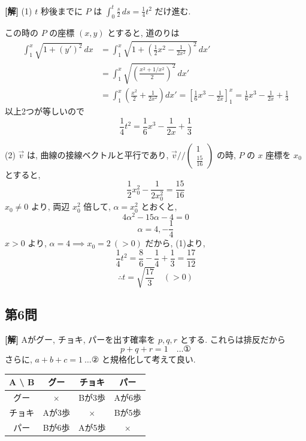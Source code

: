 \documentclass[../main.tex]{subfiles}
\begin{document}
\noindent
\textbf{[解]} (1) $t$ 秒後までに $P$ は $\int_0^t \frac{s}{2} \, ds = \frac{1}{4} t^2$ だけ進む.

この時の $P$ の座標 $(x,y)$ とすると, 道のりは
\begin{align*}
  \int_1^x \sqrt{1 + (y')^2} \, dx &= \int_1^x \sqrt{1 + \left(\frac{1}{2} x^2 - \frac{1}{2x^2}\right)^2} \, dx' \\
  &= \int_1^x \sqrt{\left(\frac{x^2 + 1/x^2}{2}\right)^2} \, dx' \\
  &= \int_1^x \left(\frac{x^2}{2} + \frac{1}{2x^2}\right) dx' = \left[ \frac{1}{6} x^3 - \frac{1}{2x} \right]_1^x = \frac{1}{6} x^3 - \frac{1}{2x} + \frac{1}{3}
\end{align*}
以上2つが等しいので
\[
  \frac{1}{4} t^2 = \frac{1}{6} x^3 - \frac{1}{2x} + \frac{1}{3}
\]

\bigskip

(2) $\vec{v}$ は, 曲線の接線ベクトルと平行であり, $\vec{v} \mathbin{/\!\!/}
\begin{pmatrix} 1 \\ \frac{15}{16}
\end{pmatrix}$ の時, $P$ の $x$ 座標を $x_0$ とすると,
\[
  \frac{1}{2} x_0^2 - \frac{1}{2 x_0^2} = \frac{15}{16}
\]
$x_0 \neq 0$ より, 両辺 $x_0^2$ 倍して, $\alpha = x_0^2$ とおくと,
\[
  4\alpha^2 - 15\alpha - 4 = 0
\]
\[
  \alpha = 4, -\frac{1}{4}
\]
$x > 0$ より, $\alpha = 4 \implies x_0 = 2 \ (>0)$ だから, (1)より,
\[
  \frac{1}{4} t^2 = \frac{8}{6} - \frac{1}{4} + \frac{1}{3} = \frac{17}{12}
\]
\[
  \therefore t = \sqrt{\frac{17}{3}} \quad (>0)
\]

\newpage

\subsection*{第6問}

\noindent
\textbf{[解]} Aがグー, チョキ, パーを出す確率を $p, q, r$ とする. これらは排反だから
\[
  p + q + r = 1 \quad \dots \text{①}
\]
さらに, $a + b + c = 1 \ \dots \text{②}$ と規格化して考えて良い.

\begin{center}
  \begin{tabular}{|c|c|c|c|}
    \hline
    A \textbackslash{} B & グー & チョキ & パー \\ \hline
    グー & $\times$ & Bが3歩 & Aが6歩 \\ \hline
    チョキ & Aが3歩 & $\times$ & Bが5歩 \\ \hline
    パー & Bが6歩 & Aが5歩 & $\times$ \\ \hline
  \end{tabular}
\end{center}
\end{document}
